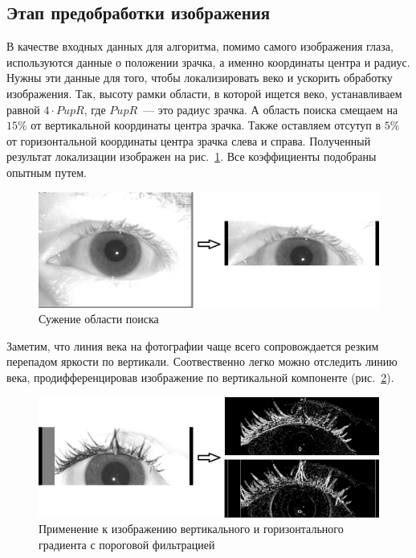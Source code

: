\documentclass[12pt,a4paper]{article} %
\begin{document}
\subsection{Этап предобработки изображения}

В качестве входных данных для алгоритма, помимо самого изображения глаза, используются данные о положении зрачка, а именно координаты центра и радиус. Нужны эти данные для того, чтобы локализировать веко и ускорить обработку изображения. Так, высоту рамки области, в которой ищется веко, устанавливаем равной $4\cdot PupR$, где $PupR$~--- это радиус зрачка. А область поиска смещаем на $15\%$ от вертикальной координаты центра зрачка. Также оставляем отсутуп в $5\%$ от горизонтальной координаты центра зрачка слева и справа. Полученный результат локализации изображен на рис.~\ref{fig:glaz6}. Все коэффициенты подобраны опытным путем.

\begin{figure}[h]
	
	\centering
	
	\includegraphics[width=0.8\linewidth]{glaz6.jpg}
	
	\caption{Сужение области поиска}
	
	\label{fig:glaz6}
	
\end{figure}

Заметим, что линия века на фотографии чаще всего сопровождается резким перепадом яркости по вертикали. Соотвественно легко можно отследить линию века, продифференцировав изображение по вертикальной компоненте (рис.~\ref{fig:glaz7}).

\begin{figure}[h]
	
	\centering
	
	\includegraphics[width=0.8\linewidth]{glaz7.jpg}
	
	\caption{Применение к изображению вертикального и горизонтального градиента с пороговой фильтрацией}
	
	\label{fig:glaz7}
	
\end{figure}
\end{document}
